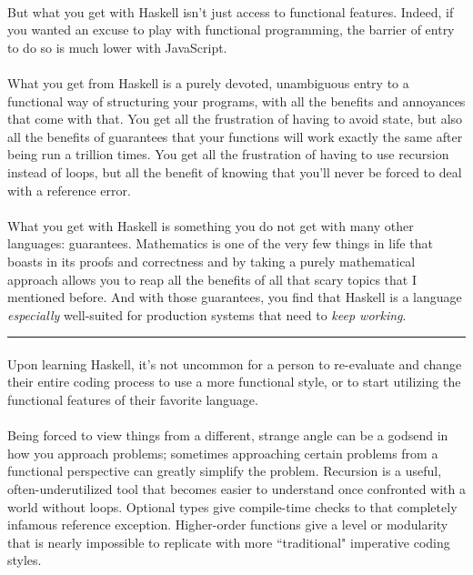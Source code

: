 \begin{foreword}
\paragraph{}
But what you get with Haskell isn't just access to functional features.  Indeed, if you wanted an excuse to play with functional programming, the barrier of entry to do so is much lower with JavaScript.  

\paragraph{}
What you get from Haskell is a purely devoted, unambiguous entry to a functional way of structuring your programs, with all the benefits and annoyances that come with that. You get all the frustration of having to avoid state, but also all the benefits of guarantees that your functions will work exactly the same after being run a trillion times. You get all the frustration of having to use recursion instead of loops, but all the benefit of knowing that you'll never be forced to deal with a  reference error. 

\paragraph{}
What you get with Haskell is something you do not get with many other languages: guarantees. Mathematics is one of the very few things in life that boasts in its proofs and correctness and by taking a purely mathematical approach allows you to reap all the benefits of all that scary topics that I mentioned before. 
And with those guarantees, you find that Haskell is a language \textit{especially} well-suited for production systems that need to \textit{keep working}.  

\rule{330pt}{1pt}

\paragraph{}
Upon learning Haskell, it's not uncommon for a person to re-evaluate and change their entire coding process to use a more functional style, or to start utilizing the functional features of their favorite language. 
\paragraph{}
Being forced to view things from a different, strange angle can be a godsend in how you approach problems; sometimes approaching certain problems from a functional perspective can greatly simplify the problem. Recursion is a useful, often-underutilized tool that becomes easier to understand once confronted with a world without loops. Optional types give compile-time checks to that completely infamous  reference exception. Higher-order functions give a level or modularity that is nearly impossible to replicate with more ``traditional" imperative coding styles. 


\end{foreword}
